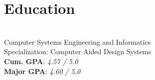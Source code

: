 \documentclass[]{deedy-resume}
\begin{document}
\begin{minipage}[t]{0.25\textwidth}
\section{Education} 

 \\
Computer Systems Engineering and Informatics \\
Specialization: Computer Aided Design Systems \\
\textbf{Cum. GPA}: \textit{4.57 / 5.0} \\
\textbf{Major GPA}: \textit{4.60 / 5.0}

\sectionspace


\end{minipage}
\hfill
\columnspace
%
%
\end{document}
